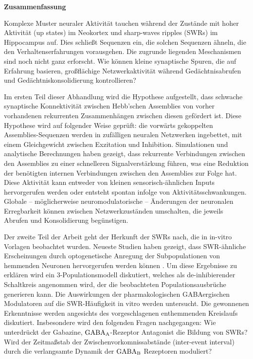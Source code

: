 \huge\textbf{Zusammenfassung}
\normalsize
\vspace{10mm}

Komplexe Muster neuraler Aktivit\"{a}t tauchen w\"{a}hrend der
Zust\"{a}nde mit hoher Aktivit\"{a}t (up states) im Neokortex und sharp-waves ripples
(SWRs) im Hippocampus auf. Dies schlie{\ss}t Sequenzen ein, die solchen Sequenzen
\"{a}hneln, die den Verhaltenserfahrungen vorausgehen. Die zugrunde liegenden Meschanismen
sind noch nicht ganz erforscht. Wie
k\"{o}nnen kleine synaptische Spuren, die auf Erfahrung basieren,
gro{\ss}fl\"{a}chige Netzwerkaktivit\"{a}t w\"{a}hrend Ged\"{a}chtnisabrufen
und Ged\"{a}chtniskonsolidierung kontrollieren?

Im ersten Teil dieser Abhandlung wird die Hypothese aufgestellt, dass
schwache synaptische Konnektivit\"{a}t zwischen Hebb’schen
Assemblies von vorher vorhandenen rekurrenten Zusammenh\"{a}ngen zwischen
diesen gef\"{o}rdert ist. Diese Hypothese wird auf folgender Weise gepr\"{u}ft:
die vorw\"{a}rts gekoppelten Assemblies-Sequenzen werden in zuf\"{a}lligen
neuralen Netzwerken ingebettet, mit einem Gleichgewicht zwischen Exzitation und
Inhibition. Simulationen und analytische Berechnungen haben gezeigt, dass
rekurrente Verbindungen zwischen den Assemblies zu einer schnelleren
Signalverst\"{a}rkung f\"{u}hren, was eine Reduktion der ben\"{o}tigten
internen Verbindungen zwischen den Assemblies zur Folge hat. Diese Aktivit\"{a}t
kann entweder von kleinen sensorisch-\"{a}hnlichen Inputs
hervorgerufen werden oder entsteht spontan infolge von Aktivit\"{a}tsschwankungen.
Globale -- m\"{o}glicherweise
neuromodulatorische -- \"{A}nderungen der neuronalen
Erregbarkeit k\"{o}nnen zwischen Netzwerkzust\"{a}nden umschalten, die jeweils
Abrufen und Konsolidierung beg\"{u}nstigen.

Der zweite Teil der Arbeit geht der Herkunft der SWRs nach, die in in-vitro
Vorlagen beobachtet wurden. Neueste Studien haben gezeigt, dass
SWR-\"{a}hnliche Erscheinungen durch optogenetische Anregung der
Subpopulationen von hemmenden Neuronen hervorgerufen werden k\"{o}nnen
\citep{Schlingloff2014, Kohus2016}. Um diese Ergebnisse zu erkl\"{a}ren wird
ein 3-Populationsmodell diskutiert, welches als de-inhibierender Schaltkreis
angenommen wird, der die beobachteten Populationsausbrüche generieren kann. Die
Auswirkungen der pharmakologischen GABAergischen Modulatoren auf die
SWR-H\"{a}ufigkeit in vitro werden untersucht. Die gewonnenen Erkenntnisse
werden angesichts des vorgeschlagenen enthemmenden Kreislaufs diskutiert.
Insbesondere wird den folgenden Fragen nachgegangen: Wie unterdr\"{u}ckt der
Gabazine, $\rm GABA_A$-Rezeptor Antagonist die Bildung von SWRs? Wird der
Zeitma{\ss}stab der Zwischenvorkomnissabst\"{a}nde (inter-event interval)
durch die verlangsamte Dynamik der $\rm GABA_B$ Rezeptoren moduliert?

\newpage

